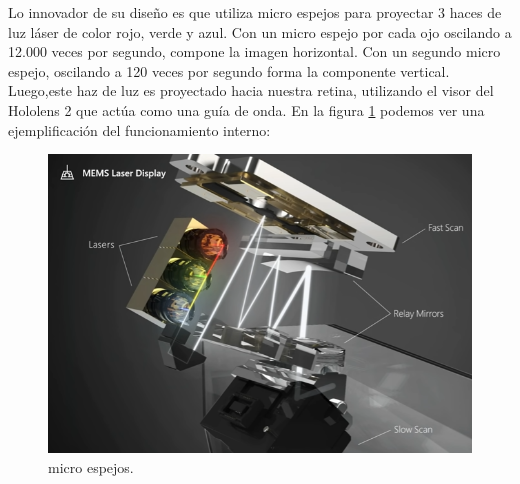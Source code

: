 \begin{table}[htpb]
	\centering
	\caption[Hardware Hololens 2]{Especificaciones técnicas}
	\label{tab:holotab}
\end{table}

Lo innovador de su diseño es que utiliza micro espejos para proyectar 3 haces de luz láser de color rojo, verde y azul. Con un micro espejo por cada ojo oscilando a 12.000 veces por segundo, compone la imagen horizontal. Con un segundo micro espejo, oscilando a 120 veces por segundo forma la componente vertical. Luego,este haz de luz es proyectado hacia nuestra retina, utilizando el visor del Hololens 2 que actúa como una guía de onda. En la figura \ref{fig:Lasers} podemos ver una ejemplificación del funcionamiento interno:

\begin{figure}[htpb]
	\centering
	\includegraphics[width=\textwidth]{./Figures/Lasers.png}
	\caption{micro espejos\protect\footnotemark.}
	\label{fig:Lasers}
\end{figure}

